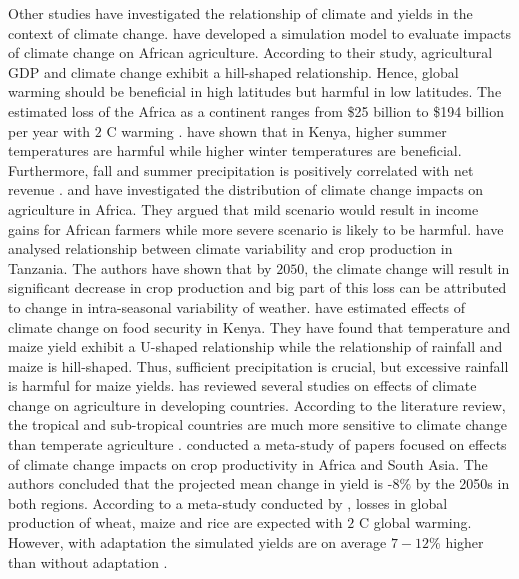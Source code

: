 \documentclass[a4paper,12pt]{article}
\begin{document}
Other studies have investigated the relationship of climate and yields in the context of climate change. \cite{MendelsohnDinar2000} have developed a simulation model to evaluate impacts of climate change on African agriculture. According to their study, agricultural GDP and climate change exhibit a hill-shaped relationship. Hence, global warming should be beneficial in high latitudes but harmful in low latitudes. The estimated loss of the Africa as a continent ranges from \$25 billion to \$194 billion per year with $2$ \textdegree C warming \citep{MendelsohnDinar2000}. \cite{kabubo2007} have shown that in Kenya, higher summer temperatures are harmful while higher winter temperatures are beneficial. Furthermore, fall and summer precipitation is positively correlated with net revenue \citep{kabubo2007}. \cite{KMendelsohn2008} and \cite{SeoMendelsohn} have investigated the distribution of climate change impacts on agriculture in Africa. They argued that mild scenario would result in income gains for African farmers while more severe scenario is likely to be harmful. \cite{Rowhani2011} have analysed relationship between climate variability and crop production in Tanzania. The authors have shown that by $2050$, the climate change will result in significant decrease in crop production and big part of this loss can be attributed to change in intra-seasonal variability of weather. \cite{Kabubo2015} have estimated effects of climate change on food security in Kenya. They have found that temperature and maize yield exhibit a U-shaped relationship while the relationship of rainfall and maize is hill-shaped. Thus, sufficient precipitation is crucial, but excessive rainfall is harmful for maize yields.
\cite{Mendelsohn2008} has reviewed several studies on effects of climate change on agriculture in developing countries. According to the literature review, the tropical and sub-tropical countries are much more sensitive to climate change than temperate agriculture \citep{Mendelsohn2008}. \cite{Knox2012} conducted a meta-study of papers focused on effects of climate change impacts on crop productivity in Africa and South Asia. The authors concluded that the projected mean change in yield is -$8\%$ by the 2050s in both regions. According to a meta-study conducted by \cite{Challinor2014}, losses in global production of wheat, maize and rice are expected with $2$ \textdegree C global warming. However, with adaptation the simulated yields are on average $7-12\%$ higher than without adaptation \citep{Challinor2014}.
\end{document}
